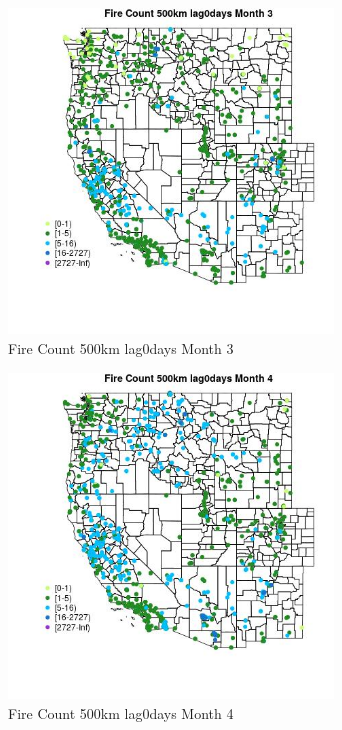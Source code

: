 \begin{figure} 
\centering  
\includegraphics[width=0.77\textwidth]{Code_Outputs/Report_ML_input_PM25_Step4_part_f_de_duplicated_aveswNAs_MapObsMo3Fire_Count_500km_lag0days.jpg} 
\caption{\label{fig:Report_ML_input_PM25_Step4_part_f_de_duplicated_aveswNAsMapObsMo3Fire_Count_500km_lag0days}Fire Count 500km lag0days Month 3} 
\end{figure} 
 

\begin{figure} 
\centering  
\includegraphics[width=0.77\textwidth]{Code_Outputs/Report_ML_input_PM25_Step4_part_f_de_duplicated_aveswNAs_MapObsMo4Fire_Count_500km_lag0days.jpg} 
\caption{\label{fig:Report_ML_input_PM25_Step4_part_f_de_duplicated_aveswNAsMapObsMo4Fire_Count_500km_lag0days}Fire Count 500km lag0days Month 4} 
\end{figure} 
 

